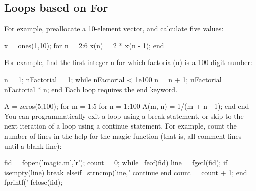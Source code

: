 \subsection{Loops based on For}

For example, preallocate a 10-element vector, and calculate five values:

x = ones(1,10);
for n = 2:6
    x(n) = 2 * x(n - 1);
end

For example, find the first integer n for which factorial(n) is a 100-digit number:

n = 1;
nFactorial = 1;
while nFactorial < 1e100
    n = n + 1;
    nFactorial = nFactorial * n;
end
Each loop requires the end keyword.

A = zeros(5,100);
for m = 1:5
    for n = 1:100
        A(m, n) = 1/(m + n - 1);
    end
end
You can programmatically exit a loop using a break statement, or skip to the next iteration of a loop using a continue statement. For example, count the number of lines in the help for the magic function (that is, all comment lines until a blank line):

fid = fopen('magic.m','r');
count = 0;
while ~feof(fid)
    line = fgetl(fid);
    if isempty(line)
       break
    elseif ~strncmp(line,'%
       continue
    end
    count = count + 1;
end
fprintf('%
fclose(fid);













